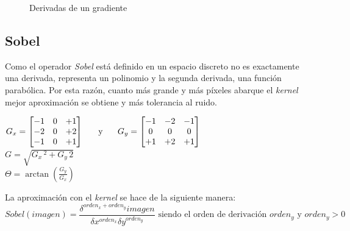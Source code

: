 \begin{figure}[H]
  \caption{Derivadas de un gradiente}
  \centering \setlength\fboxsep{0pt} \setlength\fboxrule{0.5pt}
\end{figure}

\subsection{Sobel}
Como el operador \emph{Sobel} \emph{\citep*[History and definition of
  the sobel operator]{sobel2014history}} está definido en un espacio
discreto no es exactamente una derivada, representa un polinomio y la
segunda derivada, una función parabólica. Por esta razón, cuanto más
grande y más píxeles abarque el \emph{kernel} mejor aproximación se
obtiene y más tolerancia al ruido.
\begin{center}
  $ G_x = \begin{bmatrix}
    -1 & 0 & +1 \\
    -2 & 0 & +2 \\
    -1 & 0 & +1 \\
  \end{bmatrix}
  \hspace{0.5cm} \text{ y } \hspace{0.5cm} G_y = \begin{bmatrix}
    -1 & -2 & -1 \\
    0 & 0 & 0 \\
    +1 & +2 & +1 \\
  \end{bmatrix}
  $
  \\[0.5cm]
  $G = \sqrt{G_x\,^2 + G_y\,{2}}$
  \\[0.5cm]
  $\Theta= \arctan\left(\frac{G_y}{G_x} \right)$
\end{center}
La aproximación con el \emph{kernel} se hace de la siguiente manera:
\begin{equation*}
  Sobel(imagen) = \frac{\delta^{orden_x + orden_y} imagen}{\delta x^{orden_x} \delta
    y^{orden_y}} \text{ siendo el orden de derivación } orden_y \text{ y } orden_y > 0
\end{equation*}

